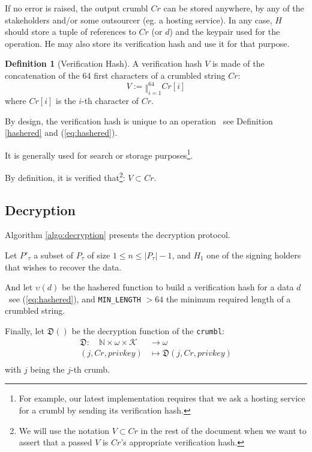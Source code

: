 \documentclass[twoside,twocolumn]{article}
\theoremstyle{definition}
\newtheorem{definition}{Definition}
\theoremstyle{remark}
\begin{document}
If no error is raised, the output crumbl $Cr$ can be stored anywhere, by any of the stakeholders and/or some outsourcer (eg. a hosting service). In any 
case, $H$ should store a tuple of references to $Cr$ (or $d$) and the keypair used for the operation. He may also store its verification hash and use 
it for that purpose.

\begin{definition}[Verification Hash]
    \label{verificationHash}
    A verification hash $V$ is made of the concatenation of the 64 first characters of a crumbled string $Cr$:
    \begin{equation}
        \label{eq:verificationHash}
        V := \mathbin\Vert_{i=1}^{64} Cr[i]
    \end{equation}
    where $Cr[i]$ is the $i$-th character of $Cr$.

    By design, the verification hash is unique to an operation \textemdash~see Definition \ref{hashered} and (\ref{eq:hashered}).

    It is generally used for search or storage purposes\footnote{For example, our latest implementation requires that we ask a hosting service for a 
    crumbl by sending its verification hash.}.

    By definition, it is verified that\footnote{We will use the notation $V \subset Cr$ in the rest of the document when we want to assert that a 
    passed $V$ is $Cr$'s appropriate verification hash.}: $V \subset Cr$.
\end{definition}

\subsection{Decryption}

Algorithm \ref{algo:decryption} presents the decryption protocol.

\vspace{1em} %

Let $P'_\tau$ a subset of $P_\tau$ of size $1 \leq n \leq |P_\tau| - 1$, and $H_1$ one of the signing holders that wishes to recover the data.

And let $\upsilon(d)$ be the hashered function to build a verification hash for a data $d$ \textemdash~see (\ref{eq:hashered}), and 
\texttt{MIN\_LENGTH} $ > 64$ the minimum required length of a crumbled string.

Finally, let $\mathfrak{D}()$ be the decryption function of the \texttt{crumbl}:
\begin{equation}
    \label{eq:decrypt}
    \begin{array}{rl}
        \mathfrak{D}: \quad \mathbb{N} \times \omega \times \mathcal{K} &\to \omega \\
                (j, Cr, privkey) &\mapsto \mathfrak{D}(j, Cr, privkey) \\
    \end{array}
\end{equation}
with $j$ being the $j$-th crumb.
\end{document}
